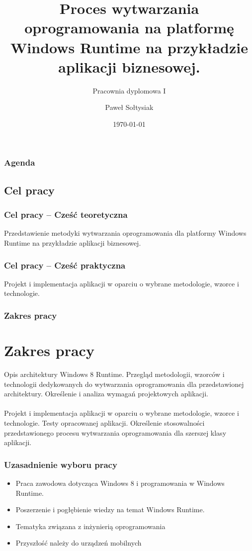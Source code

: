 \documentclass{beamer}
\title{Proces wytwarzania oprogramowania na platformę Windows Runtime na przykładzie aplikacji biznesowej.}
\subtitle{Pracownia dyplomowa I}
\author{Paweł Sołtysiak}
\institute{Opiekun pracy: dr inż.  Witold Maćków\\Kierownik Katedry: prof. dr hab. inż. Włodzimierz Bielecki}
\date{\today}
\begin{document}
\begin{frame}
\titlepage
\end{frame} 

\begin{frame}
\frametitle{Agenda} 
\tableofcontents
\end{frame} 

\begin{frame}
\section{Cel pracy}
\frametitle{Cel pracy -- Cześć teoretyczna} 
Przedstawienie metodyki wytwarzania oprogramowania dla platformy Windows Runtime na przykładzie aplikacji biznesowej.
\end{frame}

\begin{frame}
\frametitle{Cel pracy -- Cześć praktyczna} 
Projekt i implementacja aplikacji w oparciu o wybrane metodologie, wzorce i technologie.
\end{frame}

\begin{frame}
\frametitle{Zakres pracy} 
\section{Zakres pracy}
Opis architektury Windows 8 Runtime. Przegląd metodologii, wzorców i technologii dedykowanych do wytwarzania oprogramowania dla przedstawionej architektury. Określenie i analiza wymagań projektowych aplikacji.\\
~\\
Projekt i implementacja aplikacji w oparciu o wybrane metodologie, wzorce i technologie. Testy opracowanej aplikacji. Określenie stosowalności przedstawionego procesu wytwarzania oprogramowania dla szerszej klasy aplikacji.
\end{frame}


\begin{frame}
\frametitle{Uzasadnienie wyboru pracy} 
\begin{itemize}
\item Praca zawodowa dotycząca Windows 8 i programowania w Windows Runtime.
\item Poszerzenie i pogłębienie wiedzy na temat Windows Runtime.
\item Tematyka związana z inżynierią oprogramowania
\item Przyszłość należy do urządzeń mobilnych 
\end{itemize}
\end{frame}
\end{document}
